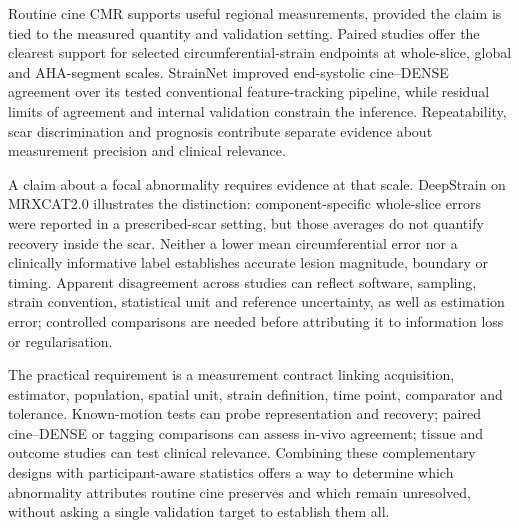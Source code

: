 Routine cine CMR supports useful regional measurements, provided the claim is tied to the measured quantity and validation setting. Paired studies offer the clearest support for selected circumferential-strain endpoints at whole-slice, global and AHA-segment scales. StrainNet improved end-systolic cine--DENSE agreement over its tested conventional feature-tracking pipeline, while residual limits of agreement and internal validation constrain the inference. Repeatability, scar discrimination and prognosis contribute separate evidence about measurement precision and clinical relevance.

A claim about a focal abnormality requires evidence at that scale. DeepStrain on MRXCAT2.0 illustrates the distinction: component-specific whole-slice errors were reported in a prescribed-scar setting, but those averages do not quantify recovery inside the scar. Neither a lower mean circumferential error nor a clinically informative label establishes accurate lesion magnitude, boundary or timing. Apparent disagreement across studies can reflect software, sampling, strain convention, statistical unit and reference uncertainty, as well as estimation error; controlled comparisons are needed before attributing it to information loss or regularisation.

The practical requirement is a measurement contract linking acquisition, estimator, population, spatial unit, strain definition, time point, comparator and tolerance. Known-motion tests can probe representation and recovery; paired cine--DENSE or tagging comparisons can assess in-vivo agreement; tissue and outcome studies can test clinical relevance. Combining these complementary designs with participant-aware statistics offers a way to determine which abnormality attributes routine cine preserves and which remain unresolved, without asking a single validation target to establish them all.
